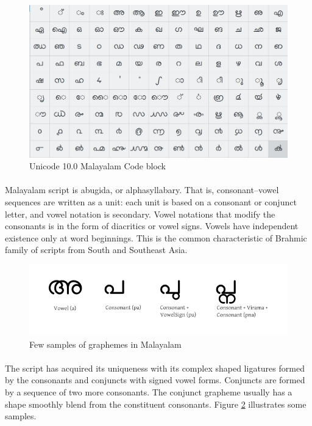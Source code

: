 \documentclass[10pt]{article}
\begin{document}
\begin{figure}[h!]
	\centering
	\includegraphics[scale=0.2]{images/unicodeml.png}
	\caption{Unicode 10.0 Malayalam Code block}
	\label{unicode}
\end{figure} 


\paragraph{}
Malayalam script is abugida, or alphasyllabary. That is, consonant–vowel sequences are written as a unit: each unit is based on a consonant or conjunct letter, and vowel notation is secondary. Vowel notations that modify the consonants is in the form of diacritics or vowel signs. Vowels have independent existence only at word beginnings. This is the common characteristic of Brahmic family of scripts from South and Southeast Asia.


\begin{figure}[h!]
	\centering
	\includegraphics[scale=0.4]{images/malayalamExamples.png}
	\caption{Few samples of graphemes in Malayalam}
	\label{malayalamsamples}
\end{figure} 


\paragraph{}
The script has acquired its uniqueness with its complex shaped ligatures formed by the consonants and conjuncts with signed vowel forms. Conjuncts are formed by a sequence of two more consonants. The conjunct grapheme usually has a shape smoothly blend from the constituent consonants. Figure \ref{malayalamsamples} illustrates some samples.
\end{document}
